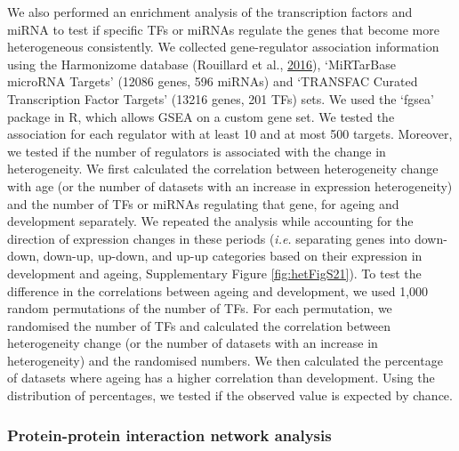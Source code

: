 \documentclass[12pt,twoside]{unicam}
\begin{document}
We also performed an enrichment analysis of the transcription factors and miRNA to test if specific TFs or miRNAs regulate the genes that become more heterogeneous consistently. We collected gene-regulator association information using the Harmonizome database (Rouillard et al., \protect\hyperlink{ref-Rouillard2016}{2016}), `MiRTarBase microRNA Targets' (12086 genes, 596 miRNAs) and `TRANSFAC Curated Transcription Factor Targets' (13216 genes, 201 TFs) sets. We used the `fgsea' package in R, which allows GSEA on a custom gene set. We tested the association for each regulator with at least 10 and at most 500 targets. Moreover, we tested if the number of regulators is associated with the change in heterogeneity. We first calculated the correlation between heterogeneity change with age (or the number of datasets with an increase in expression heterogeneity) and the number of TFs or miRNAs regulating that gene, for ageing and development separately. We repeated the analysis while accounting for the direction of expression changes in these periods (\emph{i.e.} separating genes into down-down, down-up, up-down, and up-up categories based on their expression in development and ageing, Supplementary Figure \ref{fig:hetFigS21}). To test the difference in the correlations between ageing and development, we used 1,000 random permutations of the number of TFs. For each permutation, we randomised the number of TFs and calculated the correlation between heterogeneity change (or the number of datasets with an increase in heterogeneity) and the randomised numbers. We then calculated the percentage of datasets where ageing has a higher correlation than development. Using the distribution of percentages, we tested if the observed value is expected by chance.

\hypertarget{protein-protein-interaction-network-analysis}{%
\subsubsection{Protein-protein interaction network analysis}\label{protein-protein-interaction-network-analysis}}
\end{document}
